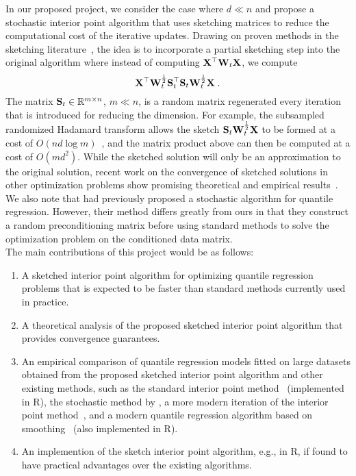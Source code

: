 In our proposed project, we consider the case where $d\ll n$ and propose a stochastic interior point algorithm that uses sketching matrices to reduce the computational cost of the iterative updates. Drawing on proven methods in the sketching literature~\cite{Pilanci:2017}, the idea is to incorporate a partial sketching step into the original algorithm where instead of computing $\mathbf{X}^\top\mathbf{W}_t\mathbf{X}$, we compute
\[
\mathbf{X}^\top\mathbf{W}_t^\frac{1}{2}\mathbf{S}_t^\top\mathbf{S}_t\mathbf{W}_t^\frac{1}{2}\mathbf{X} \;.
\]
The matrix $\mathbf{S}_t\in\mathbb{R}^{m\times n}$, $m\ll n$, is a random matrix regenerated every iteration that is introduced for reducing the dimension. For example, the subsampled randomized Hadamard transform allows the sketch $\mathbf{S}_t\mathbf{W}_t^\frac{1}{2}\mathbf{X}$ to be formed at a cost of $O(nd\log m)$~\citep{Lacotte:2020}, and the matrix product above can then be computed at a cost of $O(md^2)$. While the sketched solution will only be an approximation to the original solution, recent work on the convergence of sketched solutions in other optimization problems show promising theoretical and empirical results~\citep[e.g.,][]{Pilanci:2017,Derezinski:2021,Lacotte:2021}. We also note that \citet{Yang:2013} had previously proposed a stochastic algorithm for quantile regression. However, their method differs greatly from ours in that they construct a random preconditioning matrix before using standard methods to solve the optimization problem on the conditioned data matrix.
\\

The main contributions of this project would be as follows:
\begin{enumerate}
\item
A sketched interior point algorithm for optimizing quantile regression problems that is expected to be faster than standard methods currently used in practice.
\item
A theoretical analysis of the proposed sketched interior point algorithm that provides convergence guarantees.
\item
An empirical comparison of quantile regression models fitted on large datasets obtained from the proposed sketched interior point algorithm and other existing methods, such as the standard interior point method~\citep{Portnoy:1997} (implemented in R), the stochastic method by \citet{Yang:2013}, a more modern iteration of the interior point method~\citep{Zhao:2020}, and a modern quantile regression algorithm based on smoothing~\citep{He:2021} (also implemented in R).
\item
An implemention of the sketch interior point algorithm, e.g., in R, if found to have practical advantages over the existing algorithms.
\end{enumerate}

